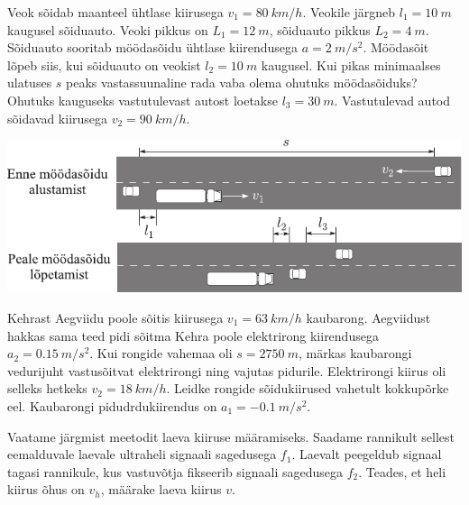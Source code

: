 \documentclass[10pt]{article}
\begin{document}
{%

Veok sõidab maanteel ühtlase kiirusega $v_1 = \SI{80}{km/h}$. Veokile järgneb $l_1 = \SI{10}{m}$ kaugusel sõiduauto. Veoki pikkus on $L_1 = \SI{12}{m}$, sõiduauto pikkus $L_2 = \SI{4}{m}$. Sõiduauto sooritab möödasõidu ühtlase kiirendusega $a = \SI{2}{m/s^2}$. Möödasõit lõpeb siis, kui sõiduauto on veokist $l_2 = \SI{10}{m}$ kaugusel. Kui pikas minimaalses ulatuses $s$ peaks vastassuunaline rada vaba olema ohutuks möödasõiduks? Ohutuks kauguseks vastutulevast autost loetakse $l_3 = \SI{30}{m}$. Vastutulevad autod sõidavad kiirusega $v_2 = \SI{90}{km/h}$.

\begin{center}
	\includegraphics[width=\linewidth]{2005-v2g-01-yl}
\end{center}
\probend
\bigskip


Kehrast Aegviidu poole sõitis kiirusega $v_1=\SI{63}{km/h}$ kaubarong. Aegviidust hakkas sama teed pidi sõitma Kehra poole elektrirong kiirendusega $a_2=\SI{0,15}{m/s^2}$. Kui rongide vahemaa oli $s=\SI{2750}{m}$, märkas kaubarongi vedurijuht vastusõitvat elektrirongi ning vajutas pidurile. Elektrirongi kiirus oli selleks hetkeks $v_2=\SI{18}{km/h}$. Leidke rongide sõidukiirused vahetult kokkupõrke eel. Kaubarongi pidudrdukiirendus on $a_1=-\SI{0,1}{m/s^2}$.
\probend
\bigskip


Vaatame järgmist meetodit laeva kiiruse määramiseks. Saadame rannikult sellest eemalduvale laevale ultraheli signaali sagedusega $f_1$. Laevalt peegeldub signaal tagasi rannikule, kus vastuvõtja fikseerib signaali sagedusega $f_2$. Teades, et heli kiirus õhus on $v_h$, määrake laeva kiirus $v$.
\probend
\bigskip

}
\end{document}
